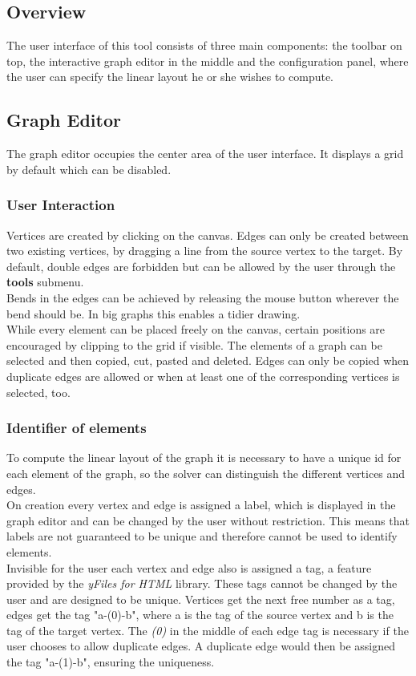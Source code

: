 \subsection{Overview}
The user interface of this tool consists of three main components: the toolbar on top, the interactive graph editor in the middle and the configuration panel, where the user can specify the linear layout he or she wishes to compute.\\
\subsection{Graph Editor}
The graph editor occupies the center area of the user interface. It displays a grid by default which can be disabled.\\
\subsubsection{User Interaction}
Vertices are created by clicking on the canvas. Edges can only be created between two existing vertices, by dragging a line from the source vertex to the target. By default, double edges are forbidden but can be allowed by the user through the \textbf{tools} submenu.\\
Bends in the edges can be achieved by releasing the mouse button wherever the bend should be. In big graphs this enables a tidier drawing.\\
While every element can be placed freely on the canvas, certain positions are encouraged by clipping to the grid if visible.
The elements of a graph can be selected and then copied, cut, pasted and deleted. Edges can only be copied when duplicate edges are allowed or when at least one of the corresponding vertices is selected, too.\\
\subsubsection{Identifier of elements}
To compute the linear layout of the graph it is necessary to have a unique id for each element of the graph, so the solver can distinguish the different vertices and edges.\\
On creation every vertex and edge is assigned a label, which is displayed in the graph editor and can be changed by the user without restriction. This means that labels are not guaranteed to be unique and therefore cannot be used to identify elements.\\
Invisible for the user each vertex and edge also is assigned a tag, a feature provided by the \textit{yFiles for HTML} library. These tags cannot be changed by the user and are designed to be unique. Vertices get the next free number as a tag, edges get the tag "a-(0)-b", where a is the tag of the source vertex and b is the tag of the target vertex. The \textit{(0)} in the middle of each edge tag is necessary if the user chooses to allow duplicate edges. A duplicate edge would then be assigned the tag "a-(1)-b", ensuring the uniqueness.
